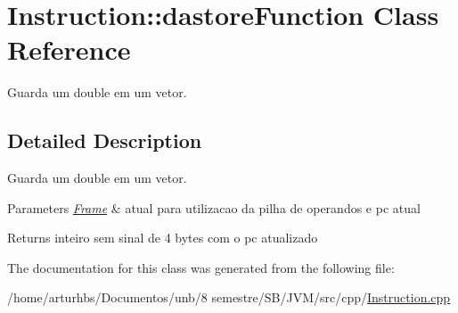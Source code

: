 \hypertarget{classInstruction_1_1dastoreFunction}{}\section{Instruction\+:\+:dastore\+Function Class Reference}
\label{classInstruction_1_1dastoreFunction}


Guarda um double em um vetor.  




\subsection{Detailed Description}
Guarda um double em um vetor. 


\begin{DoxyParams}{Parameters}
{\em \hyperlink{classFrame}{Frame}} & atual para utilizacao da pilha de operandos e pc atual \\
\hline
\end{DoxyParams}
\begin{DoxyReturn}{Returns}
inteiro sem sinal de 4 bytes com o pc atualizado 
\end{DoxyReturn}


The documentation for this class was generated from the following file\+:\begin{DoxyCompactItemize}
\item 
/home/arturhbs/\+Documentos/unb/8 semestre/\+S\+B/\+J\+V\+M/src/cpp/\hyperlink{Instruction_8cpp}{Instruction.\+cpp}\end{DoxyCompactItemize}
